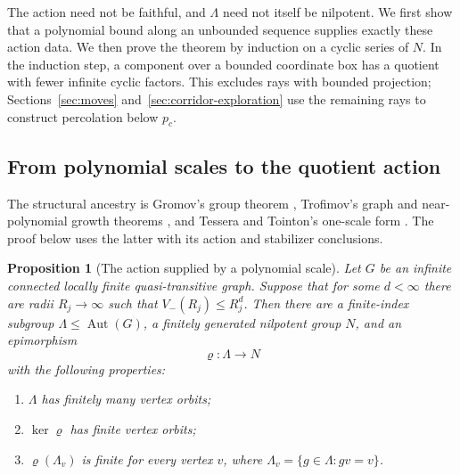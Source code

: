 \documentclass[11pt]{article}
\newtheorem{proposition}[theorem]{Proposition}
\theoremstyle{definition}
\newcommand{\pc}{p_c}
\begin{document}
The action need not be faithful, and \(\Lambda\) need not itself be
nilpotent. We first show that a polynomial bound along an unbounded
sequence supplies exactly these action data. We then prove the theorem
by induction on a cyclic series of \(N\). In the induction step, a
component over a bounded coordinate box has a quotient with fewer
infinite cyclic factors. This excludes rays with bounded projection;
Sections~\ref{sec:moves} and~\ref{sec:corridor-exploration} use the
remaining rays to construct percolation below \(\pc\).

\subsection{From polynomial scales to the quotient action}

The structural ancestry is Gromov's group theorem \cite{Gromov1981},
Trofimov's graph and near-polynomial growth theorems
\cite{Trofimov1985,Trofimov2003}, and Tessera and Tointon's one-scale
form \cite{TesseraTointon2021}. The proof below uses the latter with
its action and stabilizer conclusions.

\begin{proposition}[The action supplied by a polynomial scale]
\label{prop:nilpotent-model}
Let $G$ be an infinite connected locally finite quasi-transitive graph.
Suppose that for some $d<\infty$ there are radii $R_j\to\infty$ such that
$V_-(R_j)\le R_j^d$. Then there are a finite-index subgroup
$\Lambda\le\operatorname{Aut}(G)$, a finitely generated nilpotent group
$N$, and an epimorphism
\[
 \varrho:\Lambda\longrightarrow N
\]
with the following properties:
\begin{enumerate}
 \item $\Lambda$ has finitely many vertex orbits;
 \item $\ker\varrho$ has finite vertex orbits;
 \item $\varrho(\Lambda_v)$ is finite for every vertex $v$, where
 $\Lambda_v=\{g\in\Lambda:gv=v\}$.
\end{enumerate}
\end{proposition}
\end{document}
